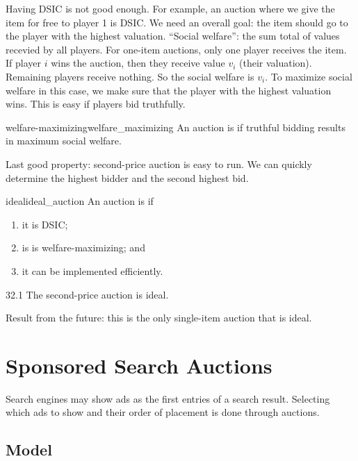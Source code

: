 \documentclass[12pt,letterpaper]{report}
\begin{document}
Having DSIC is not good enough.
For example, an auction where we give the item for free to player 1 is DSIC.
We need an overall goal: the item should go to the player with the highest valuation.
``Social welfare'': the sum total of values recevied by all players.
For one-item auctions, only one player receives the item.
If player $i$ wins the auction, then they receive value $v_i$ (their valuation).
Remaining players receive nothing.
So the social welfare is $v_i$.
To maximize social welfare in this case, we make sure that the player with the highest valuation
wins.
This is easy if players bid truthfully.

\begin{defn}{welfare-maximizing}{welfare_maximizing}
  An auction is  if truthful bidding results in maximum social welfare.
\end{defn}

Last good property: second-price auction is easy to run.
We can quickly determine the highest bidder and the second highest bid.

\begin{defn}{ideal}{ideal_auction}
  An auction is  if
  \begin{enumerate}
    \item it is DSIC;
    \item is is welfare-maximizing; and
    \item it can be implemented efficiently.
  \end{enumerate}
\end{defn}

\begin{thm}{}{32.1}
  The second-price auction is ideal.
\end{thm}

Result from the future: this is the only single-item auction that is ideal.

\section{Sponsored Search Auctions}

Search engines may show ads as the first entries of a search result.
Selecting which ads to show and their order of placement is done through auctions.

\subsection{Model}
\end{document}
